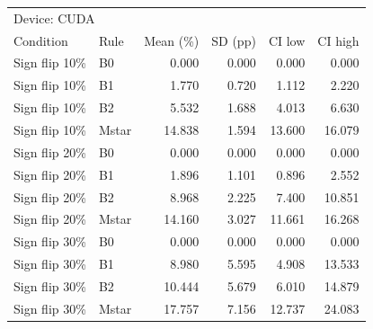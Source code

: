 \begin{tabular}{llrrrr}
\toprule
\multicolumn{6}{l}{Device: CUDA} \\
Condition & Rule & Mean (\%) & SD (pp) & CI low & CI high \\
\midrule
Sign flip 10\% & B0 & 0.000 & 0.000 & 0.000 & 0.000 \\
Sign flip 10\% & B1 & 1.770 & 0.720 & 1.112 & 2.220 \\
Sign flip 10\% & B2 & 5.532 & 1.688 & 4.013 & 6.630 \\
Sign flip 10\% & Mstar & 14.838 & 1.594 & 13.600 & 16.079 \\
Sign flip 20\% & B0 & 0.000 & 0.000 & 0.000 & 0.000 \\
Sign flip 20\% & B1 & 1.896 & 1.101 & 0.896 & 2.552 \\
Sign flip 20\% & B2 & 8.968 & 2.225 & 7.400 & 10.851 \\
Sign flip 20\% & Mstar & 14.160 & 3.027 & 11.661 & 16.268 \\
Sign flip 30\% & B0 & 0.000 & 0.000 & 0.000 & 0.000 \\
Sign flip 30\% & B1 & 8.980 & 5.595 & 4.908 & 13.533 \\
Sign flip 30\% & B2 & 10.444 & 5.679 & 6.010 & 14.879 \\
Sign flip 30\% & Mstar & 17.757 & 7.156 & 12.737 & 24.083 \\
\bottomrule
\end{tabular}

